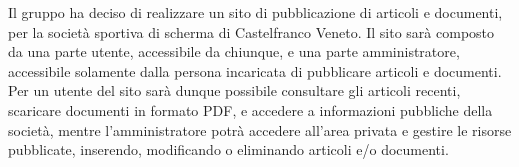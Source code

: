 Il gruppo ha deciso di realizzare un sito di pubblicazione di articoli e documenti, per la societ\`a sportiva di scherma di Castelfranco Veneto. Il sito sar\`a composto da una parte utente, accessibile da chiunque, e una parte amministratore, accessibile solamente dalla persona incaricata di pubblicare articoli e documenti. 
Per un utente del sito sar\`a dunque possibile consultare gli articoli recenti, scaricare documenti in formato PDF, e accedere a informazioni pubbliche della societ\`a, mentre l'amministratore potr\`a accedere all'area privata e gestire le risorse pubblicate, inserendo, modificando o eliminando articoli e/o documenti.\\


